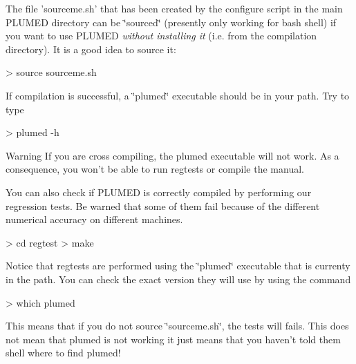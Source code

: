 The file 'sourceme.\+sh' that has been created by the configure script in the main P\+L\+U\+M\+E\+D directory can be \char`\"{}sourced\char`\"{} (presently only working for bash shell) if you want to use P\+L\+U\+M\+E\+D {\itshape without installing it} (i.\+e. from the compilation directory). It is a good idea to source it\+: \begin{DoxyVerb}> source sourceme.sh
\end{DoxyVerb}


If compilation is successful, a \char`\"{}plumed\char`\"{} executable should be in your path. Try to type \begin{DoxyVerb}> plumed -h
\end{DoxyVerb}


\begin{DoxyWarning}{Warning}
If you are cross compiling, the plumed executable will not work. As a consequence, you won't be able to run regtests or compile the manual.
\end{DoxyWarning}
You can also check if P\+L\+U\+M\+E\+D is correctly compiled by performing our regression tests. Be warned that some of them fail because of the different numerical accuracy on different machines. \begin{DoxyVerb}> cd regtest
> make
\end{DoxyVerb}
 Notice that regtests are performed using the \char`\"{}plumed\char`\"{} executable that is currenty in the path. You can check the exact version they will use by using the command \begin{DoxyVerb}> which plumed
\end{DoxyVerb}
 This means that if you do not source \char`\"{}sourceme.\+sh\char`\"{}, the tests will fails. This does not mean that plumed is not working it just means that you haven't told them shell where to find plumed!

